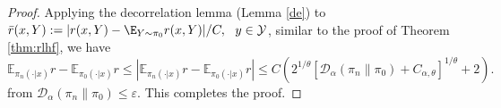 \documentclass[11pt]{article}
\providecommand{\DD}{\mathcal{D}}
\begin{document}
\begin{proof}
Applying the decorrelation lemma (Lemma \ref{de}) to $\bar r(x,Y):= |r(x,Y)-\E_{Y\sim\pi_0}r(x,Y)|/C,~~y\in\mathcal Y$, similar to the proof of Theorem \ref{thm:rlhf}, we have
\[
\mathbb{E}_{\pi_n(\cdot|x)} r - \mathbb{E}_{\pi_0(\cdot|x)} r \le |\mathbb{E}_{\pi_n(\cdot|x)} r - \mathbb{E}_{\pi_0(\cdot|x)} r|
\leq C \left( 2^{1/\theta} \left[ \DD_\alpha(\pi_n \| \pi_0) +C_{\alpha,\theta}\right]^{1/\theta} + 2 \right).
\]
from $\DD_\alpha(\pi_n\|\pi_0)\leq \varepsilon$. This completes the proof.
\end{proof}








\end{document}

